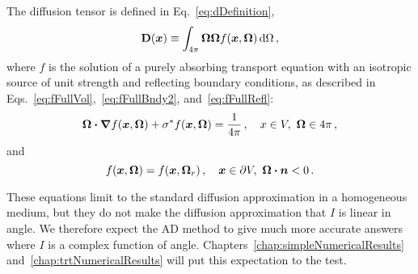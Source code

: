 The diffusion tensor is defined in Eq.~\eqref{eq:dDefinition},
\begin{equation*}
  \mathbf{D}(\bm{x}) \equiv \int_{4\pi} \bm{\Omega} \bm{\Omega}
  f(\bm{x}, \bm{\Omega}) \mathop{}\!\mathrm{d}\Omega \,,
\end{equation*}
where $f$ is the solution of a purely absorbing transport equation with an
isotropic source of unit strength and reflecting boundary conditions, as
described in Eqs.~\eqref{eq:fFullVol},~\eqref{eq:fFullBndy2},
and~\eqref{eq:fFullRefl}:
\begin{equation*}
    \bm{\Omega}\bm{\cdot} \bm{\nabla} f(\bm{x}, \bm{\Omega})
    + \sigma^\ast f (\bm{x}, \bm{\Omega})
  = \frac{1}{4\pi} \,, \quad x \in V,\ \bm{\Omega} \in 4\pi\,,
\end{equation*}
and
\begin{equation*}
  f(\bm{x}, \bm{\Omega}) = f(\bm{x}, \bm{\Omega}_r) \,,
 \quad \bm{x} \in \partial V, \ \bm{\Omega} \bm{\cdot} \bm{n} < 0\,.
\end{equation*}

These equations limit to the standard diffusion approximation in a homogeneous
medium, but they do not make the diffusion approximation that $I$ is linear in
angle. We therefore expect the AD method to give much more accurate answers
where $I$ is a complex function of angle.
Chapters~\ref{chap:simpleNumericalResults}
and~\ref{chap:trtNumericalResults} will put this expectation to the test.

